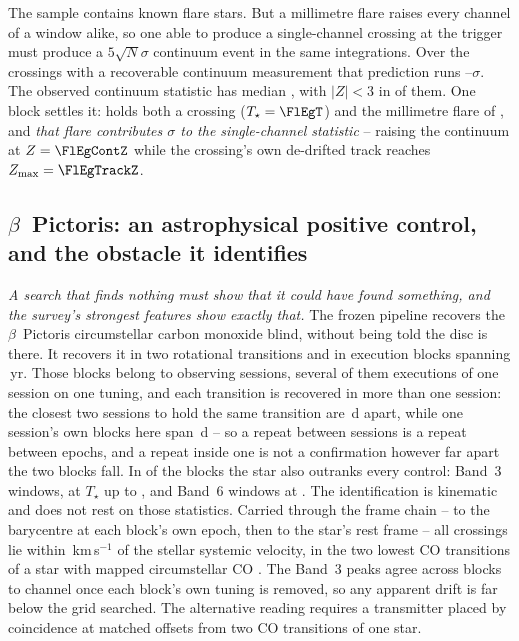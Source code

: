 The sample contains known flare stars. But a millimetre flare raises every
channel of a window alike, so one able to produce a single-channel crossing at
the trigger must produce a $5\sqrt{N}\sigma$ continuum event in the same
integrations. Over the \FlNCont{} crossings with a recoverable continuum measurement
that prediction runs \FlPredLo--\FlPredHi$\sigma$. The observed continuum
statistic has median \FlObsMed, with $|Z|<3$ in \FlNQuiet{} of them. One block settles it: \FlEgStar{} \texttt{\FlEgEb} holds both a
crossing ($T_\star=\FlEgT$) and the millimetre flare of
\citet{MacGregor2020}, and \emph{that flare contributes \FlEgContrib$\sigma$
to the single-channel statistic} -- raising the continuum at $Z=\FlEgContZ$
while the crossing's own de-drifted track reaches $Z_{\max}=\FlEgTrackZ$.

\subsection{$\beta$~Pictoris: an astrophysical positive control, and the
obstacle it identifies} \label{sec:bpicval}

\emph{A search that finds nothing must show that it could have found
something, and the survey's strongest features show exactly that.} The
frozen pipeline recovers the $\beta$~Pictoris circumstellar carbon monoxide
blind, without being told the disc is there. It recovers it in two
rotational transitions and in \CsBpCoBlocks{} execution
blocks spanning \BpBaselineYr\,yr. Those blocks belong to \CsBpCoSess{}
observing sessions, several of them executions of one session on one
tuning, and each transition is recovered in more than one session: the
closest two sessions to hold the same transition are \CsBpCoSepMinD\,d
apart, while one session's own blocks here span \QfBpSameSessD\,d -- so a
repeat between sessions is a repeat between epochs, and a repeat inside one
is not a confirmation however far apart the two blocks fall.
In \NStageOneBpicEb{} of the blocks the star also outranks every control:
\BpicNFlagThree{} Band~3 windows, at $T_\star$ up to \BpicBThreeTsym, and
\BpicNFlagSix{} Band~6 windows at \BpicBSixTsym. The identification is kinematic and does not rest on those
statistics. Carried through the frame chain -- to the barycentre at each
block's own epoch, then to the star's rest frame -- all \BpicPanelNCo{}
crossings lie within \BpicDvCoHi\,km\,s$^{-1}$ of the stellar systemic
velocity, in the two lowest CO transitions of a star with mapped
circumstellar CO \citep{Dent2014,Matra2017}. The Band~3 peaks agree across blocks to
\BpRecThreeTuneChanMax{} channel once each block's own tuning is removed, so
any apparent drift is far below the grid searched. The alternative reading
requires a transmitter placed by coincidence at matched offsets from two CO
transitions of one star.

